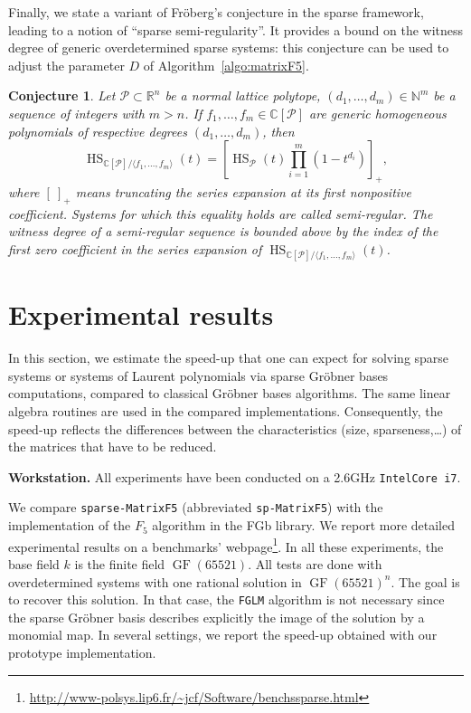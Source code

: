 \documentclass[12pt]{article}
\numberwithin{equation}{section}
\numberwithin{theorem}{section}
\newtheorem{conjecture}[theorem]{Conjecture}
\newcommand{\C}{\mathbb{C}}
\DeclareMathOperator{\GF}{GF}
\DeclareMathOperator{\HS}{HS}
\newcommand{\polytope}{\mathscr P}
\newcommand{\R}{\mathbb{R}}
\newcommand{\N}{\mathbb{N}}
\begin{document}
Finally, we state a variant of Fr\"oberg's conjecture
\cite{froberg1985inequality} in the sparse framework, leading to a
notion of ``sparse semi-regularity''. It provides a bound on the witness
degree of generic overdetermined sparse systems: this conjecture can be used to adjust the parameter $D$ of Algorithm~\ref{algo:matrixF5}.

\begin{conjecture}\label{conj:froberg}
Let $\polytope\subset\R^n$ be a normal lattice polytope, $(d_1,\ldots, d_m)\in\N^m$ be a sequence of integers with $m>n$. If $f_1,\ldots, f_m\in \C[\polytope]$ are generic homogeneous polynomials of respective degrees $(d_1,\ldots, d_m)$, then 
$$\HS_{\C[\polytope]/\langle f_1,\ldots, f_m\rangle}(t)=\left[\HS_{\polytope}(t)\prod_{i=1}^m (1-t^{d_i})\right]_+,$$
where $[~]_+$ means truncating the series expansion at its first nonpositive coefficient. 
Systems for which this equality holds are called \emph{semi-regular}. The witness degree of a semi-regular sequence is bounded above by the index of the first zero coefficient in the series expansion of $\HS_{\C[\polytope]/\langle f_1,\ldots, f_m\rangle}(t)$.
\end{conjecture}



\section{Experimental results}\label{sec:expe}
In this section, we estimate the speed-up that one can expect for solving sparse
systems or systems of Laurent polynomials via sparse Gr\"obner bases computations, compared to classical Gr\"obner bases algorithms. 
The same linear algebra routines are used in the compared implementations. Consequently, the speed-up reflects the differences between the characteristics (size, sparseness,\ldots) of the matrices that have to be reduced.  



{\bf Workstation.} All experiments have been conducted on a  2.6GHz {\tt IntelCore i7}.


We compare 
{\tt sparse-MatrixF5} (abbreviated {\tt sp-MatrixF5}) with the
implementation of the $F_5$ algorithm in the FGb library. We report
more detailed experimental results on a benchmarks'
webpage\footnote{\url{http://www-polsys.lip6.fr/~jcf/Software/benchssparse.html}}. In all these experiments, the base
field $k$ is the finite field $\GF(65521)$. All tests are done with
overdetermined systems with one rational solution in
$\GF(65521)^n$. The goal is to recover this solution. In that case,
the {\tt FGLM} algorithm is not necessary since the sparse Gr\"obner
basis describes explicitly the image of the solution by a monomial
map. In several settings, we report the speed-up obtained with our
prototype implementation.
\end{document}

